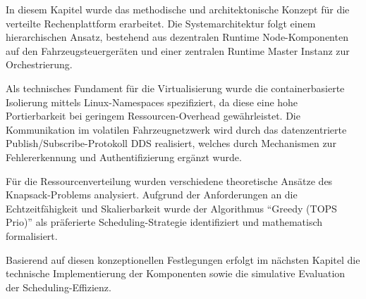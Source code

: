 In diesem Kapitel wurde das methodische und architektonische Konzept für die verteilte Rechenplattform erarbeitet. Die Systemarchitektur folgt einem hierarchischen Ansatz, bestehend aus dezentralen Runtime Node-Komponenten auf den Fahrzeugsteuergeräten und einer zentralen Runtime Master Instanz zur Orchestrierung.

Als technisches Fundament für die Virtualisierung wurde die containerbasierte Isolierung mittels Linux-Namespaces spezifiziert, da diese eine hohe Portierbarkeit bei geringem Ressourcen-Overhead gewährleistet. Die Kommunikation im volatilen Fahrzeugnetzwerk wird durch das datenzentrierte Publish/Subscribe-Protokoll \gls{DDS} realisiert, welches durch Mechanismen zur Fehlererkennung und Authentifizierung ergänzt wurde.

Für die Ressourcenverteilung wurden verschiedene theoretische Ansätze des Knapsack-Problems analysiert. Aufgrund der Anforderungen an die Echtzeitfähigkeit und Skalierbarkeit wurde der Algorithmus \enquote{Greedy (TOPS Prio)} als präferierte Scheduling-Strategie identifiziert und mathematisch formalisiert.

Basierend auf diesen konzeptionellen Festlegungen erfolgt im nächsten Kapitel die technische Implementierung der Komponenten sowie die simulative Evaluation der Scheduling-Effizienz.